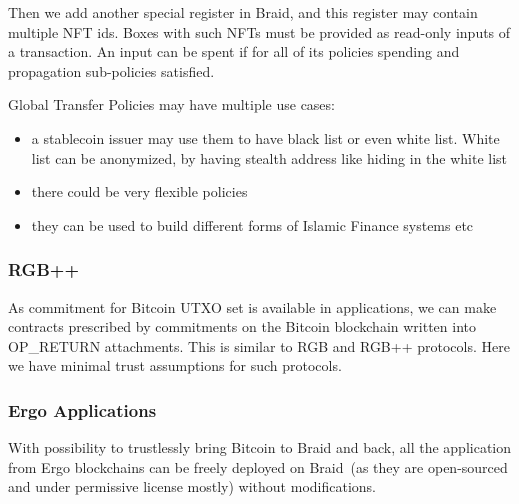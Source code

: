 \documentclass{llncs}   %
\newcommand{\authnote}[2]{\marginpar{\parbox{\marginparwidth}{\tiny %
  \textsf{#1 {\textcolor{blue}{notes: #2}}}}}%
  \textcolor{blue}{\textbf{\dag}}}
\newcommand{\authnote}[2]{
  \textsf{#1 \textcolor{blue}{: #2}}}
\newcommand{\authnote}[2]{}
\newcommand{\knote}[1]{{\authnote{\textcolor{green}{kushti notes}}{#1}}}
\newcommand{\bc}{Braid}
\begin{document}
Then we add another special register in Braid, and this register may contain multiple NFT ids. Boxes with such NFTs must be provided as read-only inputs of a transaction. An input can be spent if for all of its policies spending and propagation sub-policies satisfied.



Global Transfer Policies may have multiple use cases:

\begin{itemize}
  \item a stablecoin issuer may use them to have black list or even white list. White list can be anonymized, by having stealth address like hiding in the white list
  \item there could be very flexible policies
  \item they can be used to build different forms of Islamic Finance systems etc
\end{itemize}

\subsubsection{RGB++}

As commitment for Bitcoin UTXO set is available in applications, we can make contracts prescribed by commitments on the Bitcoin blockchain  written into OP\_RETURN attachments. This is similar to RGB and RGB++ protocols. Here we have minimal trust assumptions for such protocols.

\subsubsection{Ergo Applications}

With possibility to trustlessly bring Bitcoin to \bc{} and back, all the application from Ergo blockchains can be freely deployed on \bc{}~(as they are open-sourced and under permissive license mostly) without modifications.


\newpage
\knote{add more citations throughout the text}

 
\end{document}
